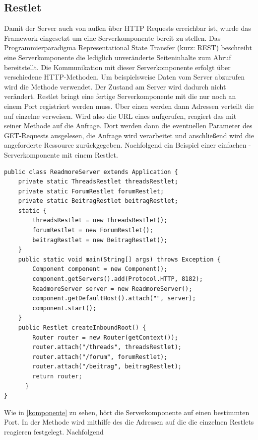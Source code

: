 \subsection{Restlet}
Damit der Server auch von außen über HTTP Requests erreichbar ist, wurde das
Framework  eingesetzt um eine 
Serverkomponente bereit zu stellen. Das Programmierparadigma Representational
State Transfer (kurz: REST) beschreibt eine Serverkomponente die lediglich
unveränderte Seiteninhalte zum Abruf bereitstellt. Die Kommunikation mit dieser
Serverkomponente erfolgt über verschiedene HTTP-Methoden. Um beispielsweise
Daten vom Server abzurufen wird die Methode  verwendet. Der Zustand am Server
wird dadurch nicht verändert. Restlet bringt eine fertige Serverkomponente mit
die nur noch an einem Port registriert werden muss. Über einen
 werden dann Adressen verteilt die auf einzelne
 verweisen. Wird also die URL eines 
aufgerufen, reagiert das  mit seiner Methode
 auf die Anfrage. Dort werden dann die eventuellen Parameter des
GET-Requests ausgelesen, die Anfrage wird verarbeitet und anschließend wird die
angeforderte Ressource zurückgegeben. Nachfolgend ein Beispiel einer einfachen
-Serverkomponente mit einem Restlet.
\begin{lstlisting}[caption=Die Serverkomponente, label=komponente]
public class ReadmoreServer extends Application {
	private static ThreadsRestlet threadsRestlet;
	private static ForumRestlet forumRestlet;
	private static BeitragRestlet beitragRestlet;
	static {
		threadsRestlet = new ThreadsRestlet();
		forumRestlet = new ForumRestlet();
		beitragRestlet = new BeitragRestlet();
	}
	public static void main(String[] args) throws Exception {
		Component component = new Component();
		component.getServers().add(Protocol.HTTP, 8182);
		ReadmoreServer server = new ReadmoreServer();
		component.getDefaultHost().attach("", server);
		component.start();
	}
	public Restlet createInboundRoot() {
	    Router router = new Router(getContext());
	    router.attach("/threads", threadsRestlet);
	    router.attach("/forum", forumRestlet);
	    router.attach("/beitrag", beitragRestlet);
	    return router;
	  }
}
\end{lstlisting}
Wie in \ref{komponente} zu sehen, hört die Serverkomponente auf einen bestimmten
Port. In der Methode  wird mithilfe des 
die Adressen auf die die einzelnen Restlets reagieren festgelegt. Nachfolgend
